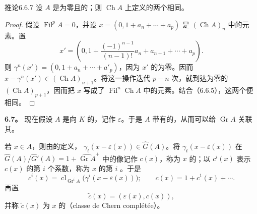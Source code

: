 \begin{SGAresult}{推论}{6.6.7}
设 $A$ 是为零且的；则 $\operatorname{Ch}A$ 上定义的两个相同。
\end{SGAresult}
\begin{proof}
假设 $\operatorname{Fil}^pA=0$，并设 $x=(0,1+a_n+\cdots+a_p)$ 是 $(\operatorname{Ch}A)_n$ 中的元素。置
\[
x'=\left(0,1+\frac{(-1)^{n-1}}{(n-1)!}a_n+a_{n+1}+\cdots+a_p\right).
\]
则 $\gamma^n(x')=(0,1+a_n+\cdots+a'_p)$，因为 $x'$ 的为零。因而
$x-\gamma^n(x')\in(\operatorname{Ch}A)_{n+1}$。将这一操作迭代 $p-n$ 次，就到达为零的 $(\operatorname{Ch}A)_{p+1}$，因而把 $x$ 写成了 $\operatorname{Fil}^n\operatorname{Ch}A$ 中的元素。结合（6.6.5），这两个便相同。
\end{proof}

\textbf{6.7。} 现在假设 $A$ 是向 $K$ 的，记作 $\varepsilon$。于是 $A$ 带有的，从而可以给 $\operatorname{Gr}A$ 关联其。

若 $x\in A$，则由的定义，
$\gamma_t(x-\varepsilon(x))\in\widehat G(A)$。将 $\gamma_t(x-\varepsilon(x))$ 在
$\widehat G(A)/\widehat G'(A)=1+\widehat{\operatorname{Gr}A}^{+}$ 中的像记作 $c(x)$，称为 $x$ 的；以 $c^i(x)$ 表示 $c(x)$ 的第 $i$ 个系数，称为 $x$ 的第 $i$ 。于是
\[
c^i(x)=\operatorname{cl}_{\operatorname{Gr}^iA}
 \bigl(\gamma^i(x-\varepsilon(x))\bigr);
\qquad c(x)=1+c^1(x)+\cdots.
\tag{6.7.1}
\]
再置
\[
\widetilde c(x)=(\varepsilon(x),c(x)),
\tag{6.7.2}
\]
并称 $\widetilde c(x)$ 为 $x$ 的（classe de Chern complétée）。

